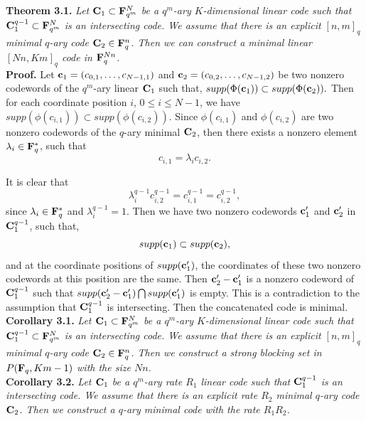 \documentclass[12pt]{article}
\begin{document}
{\bf Theorem 3.1.} {\em Let ${\bf C}_1 \subset {\bf F}_{q^m}^N$ be a $q^m$-ary $K$-dimensional linear code such that ${\bf C}_1^{q-1}\subset {\bf F}_{q^m}^N$ is an intersecting code. We assume that there is an explicit $[n,m]_q$ minimal $q$-ary code ${\bf C}_2 \in {\bf F}_q^n$. Then we can construct a minimal linear $[Nn,Km]_q$ code in ${\bf F}_q^{Nn}$.}\\

{\bf Proof.} Let ${\bf c}_1=(c_{0,1}, \ldots, c_{N-1,1})$ and ${\bf c}_2=(c_{0,2}, \ldots, c_{N-1,2})$ be two nonzero codewords of the $q^m$-ary linear ${\bf C}_1$ such that, $supp(\Phi({\bf c}_1)) \subset supp(\Phi({\bf c}_2)).$ Then for each coordinate position $i$, $0 \leq i \leq N-1$, we have $supp(\phi(c_{i,1})) \subset supp(\phi(c_{i,2}))$. Since $\phi(c_{i,1})$ and $\phi(c_{i,2})$ are two nonzero codewords of the $q$-ary minimal ${\bf C}_2$, then there exists a nonzero element $\lambda_i \in {\bf F}_q^*$, such that $$c_{i,1}=\lambda_i c_{i,2}.$$

It is clear that $$\lambda_i^{q-1} c_{i,2}^{q-1}=c_{i,1}^{q-1}=c_{i,2}^{q-1},$$ since $\lambda_i \in {\bf F}_q^*$ and $\lambda_i^{q-1}=1$. Then we have two nonzero codewords ${\bf c}_1'$ and ${\bf c}_2'$ in ${\bf C}_1^{q-1}$, such that, $$supp({\bf c}_1) \subset supp({\bf c}_2),$$ and at the coordinate positions of $supp({\bf c}_1')$, the coordinates of these two nonzero codewords at this position are the same. Then ${\bf c}_2'-{\bf c}_1'$ is a nonzero codeword of ${\bf C}_1^{q-1}$ such that $supp({\bf c}_2'-{\bf c}_1') \bigcap supp({\bf c}_1')$ is empty. This is a contradiction to the assumption that ${\bf C}_1^{q-1}$ is intersecting. Then the concatenated code is minimal.\\

{\bf Corollary 3.1.} {\em Let ${\bf C}_1 \subset {\bf F}_{q^m}^N$ be a $q^m$-ary $K$-dimensional linear code such that ${\bf C}_1^{q-1}\subset {\bf F}_{q^m}^N$ is an intersecting code. We assume that there is an explicit $[n,m]_q$ minimal $q$-ary code ${\bf C}_2 \in {\bf F}_q^n$. Then we construct a strong blocking set in $P({\bf F}_q, Km-1)$ with the size $Nn$.}\\

{\bf Corollary 3.2.} {\em Let ${\bf C}_1$ be a $q^m$-ary rate $R_1$ linear code such that ${\bf C}_1^{q-1}$ is an intersecting code. We assume that there is an explicit rate $R_2$ minimal $q$-ary code ${\bf C}_2$. Then we construct a $q$-ary minimal code with the rate $R_1 R_2$.}\\
\end{document}
